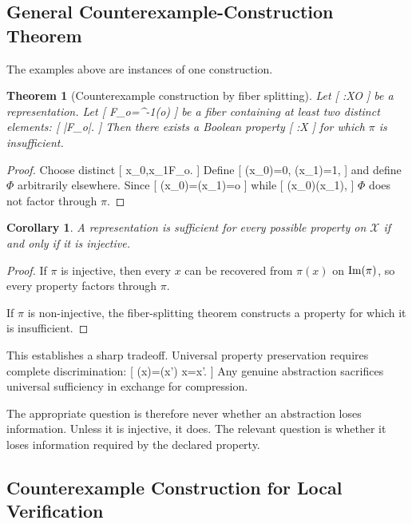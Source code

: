 \documentclass[11pt]{article}
\newtheorem{theorem}{Theorem} \newtheorem{proposition}{Proposition} \newtheorem{lemma}{Lemma} \newtheorem{corollary}{Corollary} \newtheorem{definition}{Definition} \newtheorem{remark}{Remark}
\begin{document}
\subsection{General Counterexample-Construction Theorem}

The examples above are instances of one construction.

\begin{theorem}[Counterexample construction by fiber splitting]
Let
[
\pi:\mathcal X\to\mathcal O
]
be a representation. Let
[
F_o=\pi^{-1}(o)
]
be a fiber containing at least two distinct elements:
[
|F_o|.
]
Then there exists a Boolean property
[
\Phi:\mathcal X
]
for which $\pi$ is insufficient.
\end{theorem}

\begin{proof}
Choose distinct
[
x_0,x_1\in F_o.
]
Define
[
\Phi(x_0)=0,
\qquad
\Phi(x_1)=1,
]
and define $\Phi$ arbitrarily elsewhere. Since
[
\pi(x_0)=\pi(x_1)=o
]
while
[
\Phi(x_0)\neq\Phi(x_1),
]
$\Phi$ does not factor through $\pi$.
\end{proof}

\begin{corollary}
A representation is sufficient for every possible property on $\mathcal X$ if and only if it is injective.
\end{corollary}

\begin{proof}
If $\pi$ is injective, then every $x$ can be recovered from $\pi(x)$ on $\operatorname{Im}(\pi)$, so every property factors through $\pi$.

If $\pi$ is non-injective, the fiber-splitting theorem constructs a property for which it is insufficient.
\end{proof}

This establishes a sharp tradeoff. Universal property preservation requires complete discrimination:
[
\pi(x)=\pi(x')
\Longrightarrow
x=x'.
]
Any genuine abstraction sacrifices universal sufficiency in exchange for compression.

The appropriate question is therefore never whether an abstraction loses information. Unless it is injective, it does. The relevant question is whether it loses information required by the declared property.

\subsection{Counterexample Construction for Local Verification}
\end{document}

